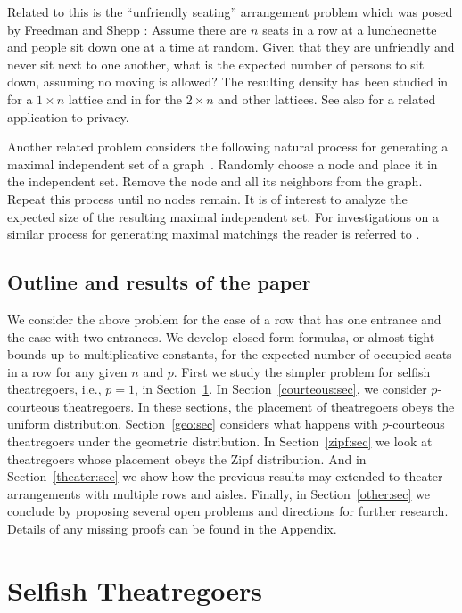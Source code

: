 \documentclass[11pt]{llncs}
\begin{document}
Related to this is the ``unfriendly seating'' arrangement problem 
which
was posed by
Freedman and Shepp \cite{freedman}:
Assume there are $n$ seats in a row at a 
luncheonette and people sit down one at a time at random.
Given that 
they are unfriendly and never sit next to one another,
what is the expected number
of persons to sit down, assuming no moving is allowed?
The resulting density has been studied in
\cite{freedman,friedman,mackenzie} for a $1 \times n$ lattice and 
in \cite{georgiou2009random} for the $2\times n$ and
other lattices.
See also \cite{kk} for a related application to privacy.

Another related problem considers the following natural 
process for generating a maximal independent set of a 
graph~\cite{mitzenmacher}.
Randomly choose a node and place it in the independent set. 
Remove the node and all its neighbors
from the graph. Repeat this process until no nodes remain. 
It is of interest to analyze the expected size of the
resulting maximal independent set. For investigations on a similar
process for generating maximal matchings 
the reader is referred to \cite{aronson1995randomized,dyer1991randomized}.

\subsection{Outline and results of the paper}

We consider the above problem for the case of
a row that has one entrance and the case with two entrances.   We
develop closed form formulas, or almost tight bounds up to multiplicative constants, for the expected
number of occupied seats in a row for any given $n$ and $p$.
First we study  
the simpler problem
for selfish theatregoers, i.e., $p=1$,
in Section~\ref{selfish:sec}. In
Section~\ref{courteous:sec}, we consider $p$-courteous theatregoers.
In these sections, the placement of theatregoers obeys the
uniform distribution.
Section~\ref{geo:sec} considers what happens with $p$-courteous theatregoers under the
geometric distribution.
In Section~\ref{zipf:sec} we look at  theatregoers  whose
placement obeys the Zipf distribution.
And in Section~\ref{theater:sec} we show how the previous results may extended 
to theater arrangements with multiple rows and aisles.
Finally, in Section~\ref{other:sec} we conclude by proposing several open problems
and directions for further research. Details of any missing proofs
can be found in the Appendix.

\section{Selfish Theatregoers}
\label{selfish:sec}
\end{document}

